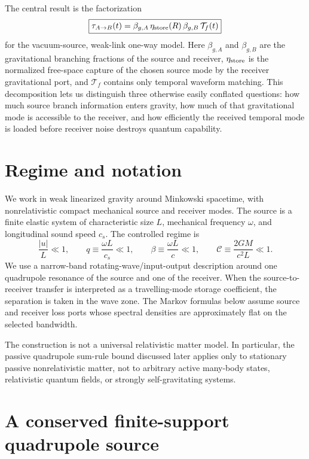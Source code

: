 \documentclass[11pt]{article}
\begin{document}
The central result is the factorization
\begin{equation}
\boxed{
\tau_{A\to B}(t)
=
\beta_{g,A}\,\eta_{\rm store}(R)\,\beta_{g,B}\,\mathcal T_f(t)
}
\label{eq:master-link}
\end{equation}
for the vacuum-source, weak-link one-way model. Here $\beta_{g,A}$ and $\beta_{g,B}$ are the gravitational branching fractions of the source and receiver, $\eta_{\rm store}$ is the normalized free-space capture of the chosen source mode by the receiver gravitational port, and $\mathcal T_f$ contains only temporal waveform matching. This decomposition lets us distinguish three otherwise easily conflated questions: how much source branch information enters gravity, how much of that gravitational mode is accessible to the receiver, and how efficiently the received temporal mode is loaded before receiver noise destroys quantum capability.

\section{Regime and notation}

We work in weak linearized gravity around Minkowski spacetime, with nonrelativistic compact mechanical source and receiver modes. The source is a finite elastic system of characteristic size $L$, mechanical frequency $\omega$, and longitudinal sound speed $c_s$. The controlled regime is
\begin{equation}
\frac{|u|}{L}\ll1,
\qquad
q\equiv\frac{\omega L}{c_s}\ll1,
\qquad
\beta\equiv\frac{\omega L}{c}\ll1,
\qquad
\mathcal C\equiv\frac{2GM}{c^2L}\ll1.
\label{eq:regime}
\end{equation}
We use a narrow-band rotating-wave/input-output description around one quadrupole resonance of the source and one of the receiver. When the source-to-receiver transfer is interpreted as a travelling-mode storage coefficient, the separation is taken in the wave zone. The Markov formulas below assume source and receiver loss ports whose spectral densities are approximately flat on the selected bandwidth.

The construction is not a universal relativistic matter model. In particular, the passive quadrupole sum-rule bound discussed later applies only to stationary passive nonrelativistic matter, not to arbitrary active many-body states, relativistic quantum fields, or strongly self-gravitating systems.

\section{A conserved finite-support quadrupole source}
\label{sec:source}
\end{document}
